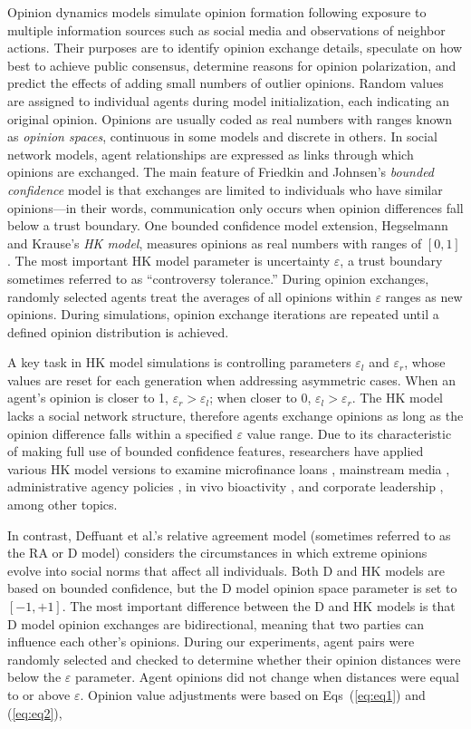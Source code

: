 \documentclass[10pt,letterpaper]{article}
\begin{document}
Opinion dynamics models simulate opinion formation following exposure to multiple information sources such as social media and observations of neighbor actions. Their purposes are to identify opinion exchange details, speculate on how best to achieve public consensus, determine reasons for opinion polarization, and predict the effects of adding small numbers of outlier opinions. Random values are assigned to individual agents during model initialization, each indicating an original opinion. Opinions are usually coded as real numbers with ranges known as \textit{opinion spaces}, continuous in some models and discrete in others. In social network models, agent relationships are expressed as links through which opinions are exchanged. The main feature of Friedkin and Johnsen's \cite{Friedkin1990} \textit{bounded confidence} model is that exchanges are limited to individuals who have similar opinions---in their words, communication only occurs when opinion differences fall below a trust boundary. One bounded confidence model extension, Hegselmann and Krause's \cite{Hegselmann2002} \textit{HK model}, measures opinions as real numbers with ranges of $[0, 1]$. The most important HK model parameter is uncertainty $\varepsilon$, a trust boundary sometimes referred to as ``controversy tolerance.'' During opinion exchanges, randomly selected agents treat the averages of all opinions within $\varepsilon$ ranges as new opinions. During simulations, opinion exchange iterations are repeated until a defined opinion distribution is achieved. 

A key task in HK model simulations is controlling parameters $\varepsilon_{l}$ and $\varepsilon_{r}$, whose values are reset for each generation when addressing asymmetric cases. When an agent's opinion is closer to 1, $\varepsilon_{r} > \varepsilon_{l}$; when closer to 0, $\varepsilon_{l} > \varepsilon_{r}$. The HK model lacks a social network structure, therefore agents exchange opinions as long as the opinion difference falls within a specified $\varepsilon$ value range. Due to its characteristic of making full use of bounded confidence features, researchers have applied various HK model versions to examine microfinance loans \cite{Banerjee2013}, mainstream media \cite{Quattrociocchi2014}, administrative agency policies \cite{Rai2015}, in vivo bioactivity \cite{Vuillon2015}, and corporate leadership \cite{Dong2017,Dong2018}, among other topics.

In contrast, Deffuant et al.'s \cite{Deffuant2002} relative agreement model (sometimes referred to as the RA or D model) considers the circumstances in which extreme opinions evolve into social norms that affect all individuals. Both D and HK models are based on bounded confidence, but the D model opinion space parameter is set to $[-1, +1]$. The most important difference between the D and HK models is that D model opinion exchanges are bidirectional, meaning that two parties can influence each other's opinions. During our experiments, agent pairs were randomly selected and checked to determine whether their opinion distances were below the $\varepsilon$ parameter. Agent opinions did not change when distances were equal to or above $\varepsilon$. Opinion value adjustments were based on Eqs~(\ref{eq:eq1}) and (\ref{eq:eq2}),
\end{document}
